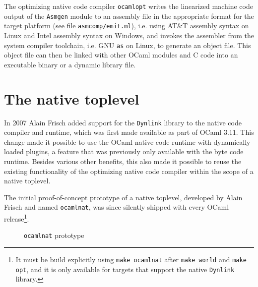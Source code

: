 \documentclass[10pt,a4paper,draft,twocolumn]{article}
\makeatletter
\newcommand{\ie}{i.e.\@\xspace}
\makeatother
\begin{document}
The optimizing native code compiler \texttt{ocamlopt} writes the linearized machine code output of
the \texttt{Asmgen} module to an assembly file in the appropriate format for the target platform (see
file \texttt{asmcomp/emit.ml}), \ie using AT\&T assembly syntax on Linux and Intel assembly syntax
on Windows, and invokes the assembler from the system compiler toolchain, \ie GNU \texttt{as} on Linux,
to generate an object file. This object file can then be linked with other OCaml modules and C code into
an executable binary or a dynamic library file.


\section{The native toplevel} \label{section:The_native_toplevel}

In 2007 Alain Frisch added support for the \texttt{Dynlink} library to the native code compiler and
runtime, which was first made available as part of OCaml 3.11. This change made it possible to use
the OCaml native code runtime with dynamically loaded plugins, a feature that was previously only
available with the byte code runtime. Besides various other benefits, this also made it possible
to reuse the existing functionality of the optimizing native code compiler within the scope of a
native toplevel.

The initial proof-of-concept prototype of a native toplevel, developed by Alain Frisch and named
\texttt{ocamlnat}, was since silently shipped with every OCaml release\footnote{It must be build
explicitly using \texttt{make ocamlnat} after \texttt{make world} and \texttt{make opt}, and it
is only available for targets that support the native \texttt{Dynlink} library.}.

\begin{figure}[htb]
  \centering
  \caption{\texttt{ocamlnat} prototype}
  \label{fig:ocamlnat_prototype}
\end{figure}
\end{document}
